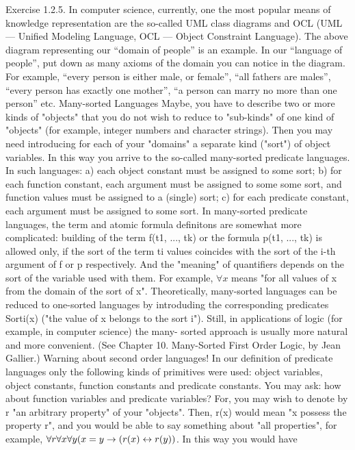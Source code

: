 Exercise 1.2.5. In computer science, currently, one the most popular means of knowledge representation are the so-called UML class diagrams and OCL (UML --- Unified Modeling Language, OCL --- Object Constraint Language). The above diagram representing our ``domain of people'' is an example. In our
``language of people'', put down as many axioms of the domain you can notice in the diagram. For example, ``every person is either male, or female'', ``all fathers are males'', ``every person has exactly one mother'', ``a person can marry no more than one person'' etc.  Many-sorted Languages
Maybe, you have to describe two or more kinds of "objects" that you do not wish to reduce to "sub-kinds" of one kind of "objects" (for example, integer numbers and character strings). Then you may need introducing for each of your "domains" a separate kind ("sort") of object variables. In this way you arrive to the so-called many-sorted predicate languages. In such
languages: a) each object constant must be assigned to some sort; b) for each function constant, each argument must be
assigned to some some sort, and function values must be assigned to a (single) sort; c) for each predicate constant, each
argument must be assigned to some sort. In many-sorted predicate languages, the term and atomic formula definitons are
somewhat more complicated: building of the term f(t1, ..., tk) or the formula p(t1, ..., tk) is allowed only, if the sort of the term ti
values coincides with the sort of the i-th argument of f or p respectively. And the "meaning" of quantifiers depends on the sort
of the variable used with them. For example, \(\forall x\) means "for all values of x from the domain of the sort of x".
Theoretically, many-sorted languages can be reduced to one-sorted languages by introduding the corresponding predicates
Sorti(x) ("the value of x belongs to the sort i"). Still, in applications of logic (for example, in computer science) the many-
sorted approach is usually more natural and more convenient. (See Chapter 10. Many-Sorted First Order Logic, by Jean
Gallier.)
Warning about second order languages!
In our definition of predicate languages only the following kinds of primitives were used: object variables, object constants,
function constants and predicate constants. You may ask: how about function variables and predicate variables? For, you
may wish to denote by r "an arbitrary property" of your "objects". Then, r(x) would mean "x possess the property r", and you
would be able to say something about "all properties", for example, \(\forall r\forall x \forall y(x=y\rightarrow (r(x)\leftrightarrow r(y))\). In this way you would have
